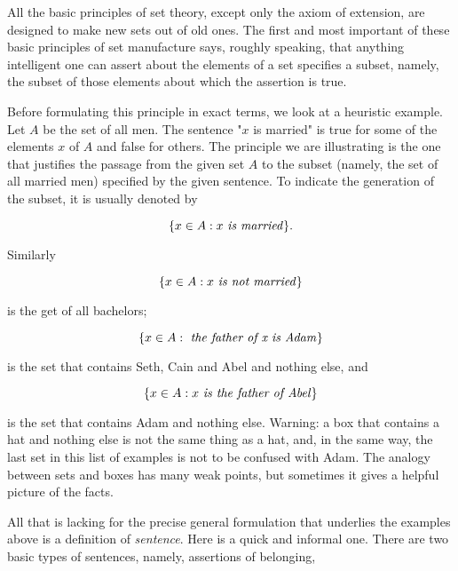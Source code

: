 
All the basic principles of set theory, except only the axiom of extension, are designed to make new sets out of old ones. The first and most important of these basic principles of set manufacture says, roughly speaking, that anything intelligent one can assert about the elements of a set specifies a subset, namely, the subset of those elements about which the assertion is true.

Before formulating this principle in exact terms, we look at a heuristic example. Let $A$ be the set of all men. The sentence "$x$ is married" is true for some of the elements $x$ of $A$ and false for others. The principle we are illustrating is the one that justifies the passage from the given set $A$ to the subset (namely, the set of all married men) specified by the given sentence. To indicate the generation of the subset, it is usually denoted by 

\begin{equation*}
\{ x \in A: x \text{ \textit{is married}} \}.
\end{equation*}

Similarly 

\begin{equation*}
\{ x \in A: x \text{ \textit{is not married}} \}
\end{equation*}

is the get of all bachelors; 

\begin{equation*}
\{ x \in A: \text{ \textit{the father of x is Adam}} \} 
\end{equation*}

is the set that contains Seth, Cain and Abel and nothing else, and

\begin{equation*}
\{ x \in A: x \text{ \textit{is the father of Abel}} \}  
\end{equation*}

is the set that contains Adam and nothing else. Warning: a box that contains a hat and nothing else is not the same thing as a hat, and, in the same way, the last set in this list of examples is not to be confused with Adam. The analogy between sets and boxes has many weak points, but sometimes it gives a helpful picture of the facts. 

All that is lacking for the precise general formulation that underlies the examples above is a definition of \textit{sentence}. Here is a quick and informal one. There are two basic types of sentences, namely, assertions of belonging,

